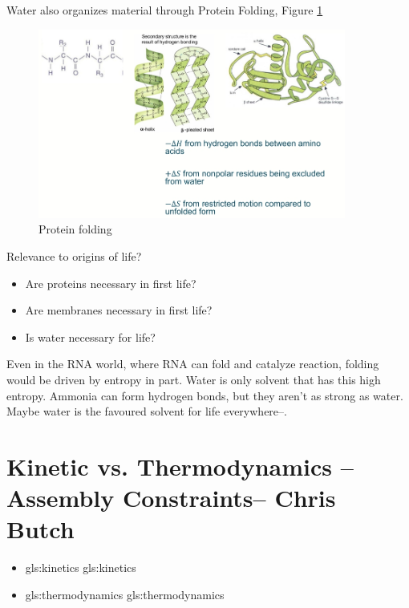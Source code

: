 \documentclass[]{article}
\begin{document}
Water also organizes material through Protein Folding, Figure \ref{fig:ProteinFolding} 
\begin{figure}[H]
	\caption{Protein folding} \label{fig:ProteinFolding} 
	\includegraphics[width=0.9\textwidth]{ProteinFolding}
\end{figure}

 Relevance to origins of life?
\begin{itemize}
	\item Are proteins necessary in first life?
	\item Are membranes necessary in first life?
	\item Is water necessary for life?
\end{itemize}

Even in the RNA world, where RNA can fold and catalyze reaction, folding would be driven by entropy in part. Water is only solvent that has this high entropy. Ammonia can form hydrogen bonds, but they aren't as strong as water. Maybe water is the favoured solvent for life everywhere--\cite{ball2017water}.

\section[Kinetic vs. Thermodynamics – Assembly Constraints]{Kinetic vs. Thermodynamics – Assembly Constraints-- Chris Butch}

\begin{itemize}
	\item \gls{gls:kinetics}  \glsdesc{gls:kinetics}
	\item \gls{gls:thermodynamics} \glsdesc{gls:thermodynamics}
\end{itemize}
\end{document}
